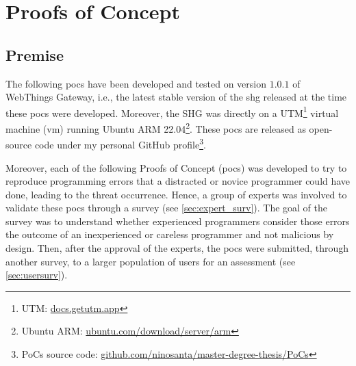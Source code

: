 \section{Proofs of Concept}
\label{sec:pocs}

\subsection{Premise}
The following \glspl{poc} have been developed and tested on version  $1.0.1$ of WebThings Gateway, i.e., the latest stable version of the \gls{shg} released at the time these \glspl{poc} were developed. Moreover, the SHG was directly on a UTM\footnote{UTM: \href{https://docs.getutm.app}{docs.getutm.app}} \gls{virtual machine} (\gls{vm}) running Ubuntu ARM 22.04\footnote{Ubuntu ARM: \href{https://ubuntu.com/download/server/arm}{ubuntu.com/download/server/arm}}. These \glspl{poc} are released as open-source code under my personal GitHub profile\footnote{PoCs source code: \href{https://github.com/ninosanta/master-degree-thesis/tree/main/PoCs}{github.com/ninosanta/master-degree-thesis/PoCs}}.

Moreover, each of the following Proofs of Concept (\glspl{poc}) was developed to try to reproduce programming errors that a distracted or novice programmer could have done, leading to the threat occurrence.
Hence, a group of experts was involved to validate these \glspl{poc} through a survey (see \autoref{sec:expert_surv}). The goal of the survey was to understand whether experienced programmers consider those errors the outcome of an inexperienced or careless programmer and not malicious by design.
Then, after the approval of the experts, the \glspl{poc} were submitted, through another survey, to a larger population of users for an assessment (see \autoref{sec:usersurv}).

